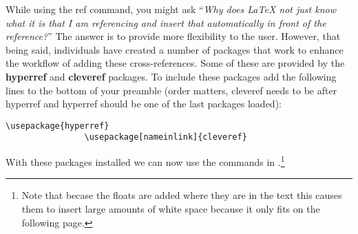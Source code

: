 			While using the ref command, you might ask \enquote{\textit{Why does \LaTeX{} not just know what it is that I am referencing and insert that automatically in front of the reference?}}
			The answer is to provide more flexibility to the user.
			However, that being said, individuals have created a number of packages that work to enhance the workflow of adding these cross-references.
			Some of these are provided by the \textbf{hyperref} and \textbf{cleveref} packages.
			To include these packages add the following lines to the bottom of your preamble (order matters, cleveref needs to be after hyperref and hyperref should be one of the last packages loaded):
			\begin{lstlisting}[style=LaTeXStyle]
				\usepackage{hyperref}
				\usepackage[nameinlink]{cleveref}
			\end{lstlisting}
			With these packages installed we can now use the commands in .\footnote{Note that becase the floats are added where they are in the text this causes them to insert large amounts of white space because it only fits on the following page.}
